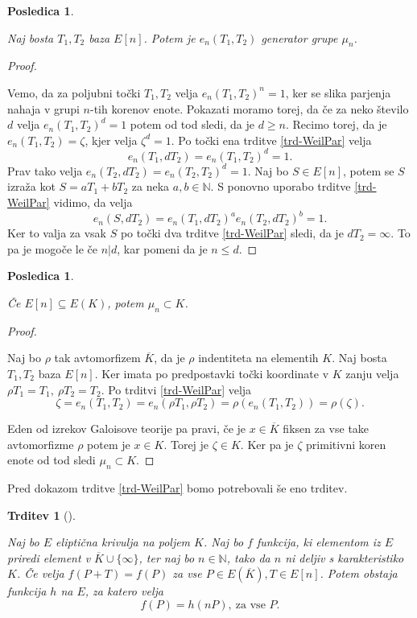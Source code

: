 \documentclass[12pt,a4paper,twoside]{article}
\theoremstyle{definition} %
\theoremstyle{plain} %
\newtheorem{trditev}[definicija]{Trditev}
\newtheorem{posledica}[definicija]{Posledica}
\numberwithin{equation}{section}  %
\newcommand{\N}{\mathbb N}
\newcommand{\E}[1]{E({#1})}
\begin{document}
\begin{posledica}~

\label{PosledicaTrdParj}
Naj bosta $T_1,T_2$ baza $E[n]$. Potem je $e_n(T_1,T_2)$ generator grupe $\mu_n$.
\end{posledica}


\begin{proof}~

Vemo, da za poljubni točki $T_1,T_2$ velja $e_n(T_1,T_2)^n = 1$, ker se slika parjenja nahaja v grupi $n$-tih korenov enote. Pokazati moramo torej, da če za neko število $d$ velja  $e_n(T_1,T_2)^d = 1$ potem od tod sledi, da je $d \geq n$.
Recimo torej, da je $e_n(T_1,T_2) = \zeta$, kjer velja $\zeta^d = 1$.
Po točki ena trditve \ref{trd-WeilPar} velja $$e_n(T_1,dT_2) = e_n(T_1,T_2)^d=1.$$ Prav tako velja $e_n(T_2,dT_2) = e_n(T_2,T_2)^d = 1 $. Naj bo $S \in E[n]$, potem se $S$ izraža kot $S = aT_1+bT_2$ za neka $a,b \in \N$.
S ponovno uporabo trditve \ref{trd-WeilPar} vidimo, da velja
$$e_n(S,dT_2)= e_n(T_1,dT_2)^ae_n(T_2,dT_2)^b = 1. $$
Ker to valja za vsak $S$ po točki dva trditve \ref{trd-WeilPar} sledi, da je $dT_2 = \infty$. To pa je mogoče le če $n|d$, kar pomeni da je $n \leq d$.
\end{proof}

\begin{posledica}~

Če $E[n] \subseteq \E{K}$, potem $\mu_n \subset K$.

\end{posledica}

\begin{proof}~

Naj bo $\rho$ tak avtomorfizem $\overline{K}$, da je $\rho$ indentiteta na elementih $K$. Naj bosta $T_1,T_2$ baza $E[n]$. Ker imata po predpostavki točki koordinate v $K$ zanju velja
$\rho T_1 = T_1, \ \rho T_2 = T_2$.
Po trditvi \ref{trd-WeilPar} velja
$$\zeta = e_n(T_1,T_2) = e_n(\rho T_1,\rho T_2) = \rho(e_n(T_1,T_2)) = \rho(\zeta).$$

Eden od izrekov Galoisove teorije pa pravi, če je $x \in \overline{K}$ fiksen za vse take avtomorfizme $\rho$ potem je $x\in K$. Torej je $\zeta \in K$. Ker pa je $\zeta$ primitivni koren enote od tod sledi $\mu_n \subset K$.

\end{proof}

Pred dokazom trditve \ref{trd-WeilPar} bomo potrebovali še eno trditev.
\begin{trditev}[]~
\label{trd:9.34}

Naj bo $E$ eliptična krivulja na poljem $K$. Naj bo $f$ funkcija, ki elementom iz $E$ priredi element v $\overline{K} \cup \{ \infty \}$, ter naj bo $n \in \N$, tako da $n$ ni deljiv s karakteristiko $K$. Če velja $f(P+T) = f(P)$ za vse $P \in E(\overline{K}), T \in E[n]$. Potem obstaja funkcija $h$ na $E$, za katero velja
$$f(P) = h(nP), \ \text{za vse } P.$$

\end{trditev}
\end{document}
